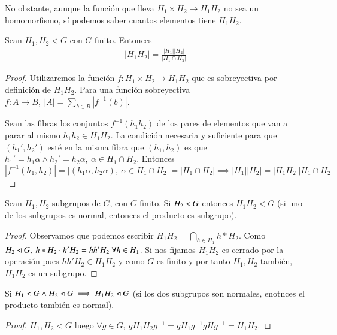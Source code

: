 No obstante, aunque la función que lleva $H_1 \times H_2 \to H_1 H_2$ no sea un homomorfismo, sí podemos saber cuantos elementos tiene $H_1H_2$.

\begin{thm}
	\label{thm:cardinalidadproductolibre}
	Sean $H_1, H_2 < G$ con $G$ finito. Entonces
	\begin{align}
	|H_1H_2| = \frac{|H_1||H_2|}{|H_1 \cap H_2|}
	\end{align}
\end{thm}

\begin{proof}
	Utilizaremos la función $f:H_1 \times H_2 \to H_1 H_2$ que es sobreyectiva por definición de $H_1 H_2$. Para una función sobreyectiva $f: A \to B,\ |A| = \sum_{b \in B} |f^{-1}(b)|$.
	
	
	Sean las fibras los conjuntos $f^{-1}(h_1h_2)$ de los pares de elementos que van a parar al mismo $h_1h_2 \in H_1 H_2$. La condición necesaria y suficiente para que $(h_1', h_2')$ esté en la misma fibra que $(h_1, h_2)$ es que $h_1' = h_1 \alpha \land h_2' = h_2 \alpha,\ \alpha \in H_1 \cap H_2$. Entonces $|f^{-1}(h_1, h_2)| = | (h_1 \alpha, h_2\alpha),\ \alpha \in H_1\cap H_2| = |H_1 \cap H_2| \implies |H_1||H_2| = |H_1 H_2| |H_1 \cap H_2|$ 
\end{proof}

\begin{thm}
	\label{thm:condicionproductolibre}
	Sean $H_1, H_2$ subgrupos de $G$, con $G$ finito. Si $H_2 \lhd G$ entonces $H_1 H_2 < G$ (si uno de los subgrupos es normal, entonces el producto es subgrupo).
\end{thm}

\begin{proof}
	Observamos que podemos escribir $H_1H_2 = \bigcap_{h \in H_1} h \ast H_2$. Como $H_2 \lhd G,\ h\ast H_2 \cdot h' H_2 = h h' H_2\ \forall h \in H_1$. Si nos fijamos $H_1 H_2$ es cerrado por la operación pues $h h' H_2 \in H_1H_2$ y como $G$ es finito y por tanto $H_1, H_2$ también, $H_1H_2$ es un subgrupo.	
\end{proof}

\begin{thm}
	Si $H_1 \lhd G \land H_2 \lhd G \implies H_1 H_2 \lhd G$ (si los dos subgrupos son normales, enotnces el producto también es normal).
\end{thm}

\begin{proof}
	$H_1,H_2 < G$ luego $\forall g \in G,\ gH_1H_2g^{-1} = gH_1g^{-1}gHg^{-1}  = H_1 H_2 $.
\end{proof}


